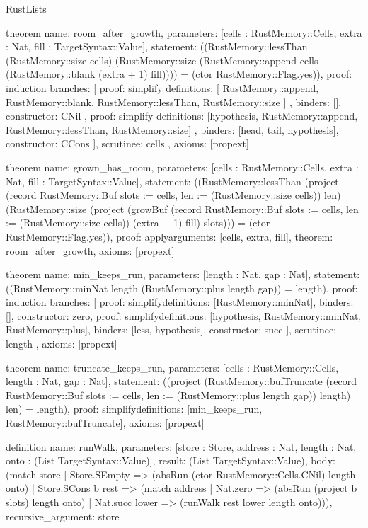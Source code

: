 \begin{lexlean}{RustLists}
\begin{semanticmodule}
theorem{
  name: room_after_growth,
  parameters: [cells : RustMemory::Cells, extra : Nat, fill : TargetSyntax::Value],
  statement: ((RustMemory::lessThan (RustMemory::size cells) (RustMemory::size (RustMemory::append cells (RustMemory::blank (extra + 1) fill)))) = (ctor RustMemory::Flag.yes)),
  proof: induction{
    branches: [
      {
        proof: simplify{
          definitions: [
            RustMemory::append,
            RustMemory::blank,
            RustMemory::lessThan,
            RustMemory::size
          ]
        },
        binders: [],
        constructor: CNil
      },
      {
        proof: simplify{
          definitions: [hypothesis, RustMemory::append, RustMemory::lessThan, RustMemory::size]
        },
        binders: [head, tail, hypothesis],
        constructor: CCons
      }
    ],
    scrutinee: cells
  },
  axioms: [propext]
}

theorem{
  name: grown_has_room,
  parameters: [cells : RustMemory::Cells, extra : Nat, fill : TargetSyntax::Value],
  statement: ((RustMemory::lessThan (project (record RustMemory::Buf {slots := cells, len := (RustMemory::size cells)}) len) (RustMemory::size (project (growBuf (record RustMemory::Buf {slots := cells, len := (RustMemory::size cells)}) (extra + 1) fill) slots))) = (ctor RustMemory::Flag.yes)),
  proof: apply{arguments: [cells, extra, fill], theorem: room_after_growth},
  axioms: [propext]
}

theorem{
  name: min_keeps_run,
  parameters: [length : Nat, gap : Nat],
  statement: ((RustMemory::minNat length (RustMemory::plus length gap)) = length),
  proof: induction{
    branches: [
      {proof: simplify{definitions: [RustMemory::minNat]}, binders: [], constructor: zero},
      {
        proof: simplify{definitions: [hypothesis, RustMemory::minNat, RustMemory::plus]},
        binders: [less, hypothesis],
        constructor: succ
      }
    ],
    scrutinee: length
  },
  axioms: [propext]
}

theorem{
  name: truncate_keeps_run,
  parameters: [cells : RustMemory::Cells, length : Nat, gap : Nat],
  statement: ((project (RustMemory::bufTruncate (record RustMemory::Buf {slots := cells, len := (RustMemory::plus length gap)}) length) len) = length),
  proof: simplify{definitions: [min_keeps_run, RustMemory::bufTruncate]},
  axioms: [propext]
}

definition{
  name: runWalk,
  parameters: [store : Store, address : Nat, length : Nat, onto : (List TargetSyntax::Value)],
  result: (List TargetSyntax::Value),
  body: (match store
    | Store.SEmpty => (absRun (ctor RustMemory::Cells.CNil) length onto)
    | Store.SCons b rest => (match address
      | Nat.zero => (absRun (project b slots) length onto)
      | Nat.succ lower => (runWalk rest lower length onto))),
  recursive_argument: store
}


\end{semanticmodule}
\end{lexlean}
